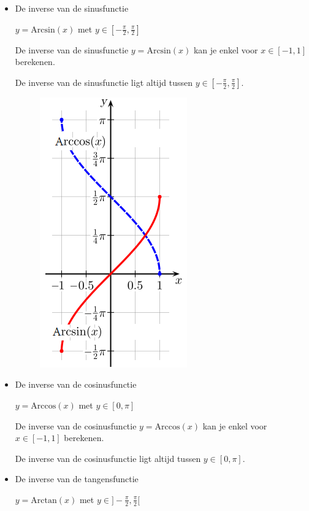\begin{itemize}
\item{De inverse van de sinusfunctie}

\noindent $y=\textrm{Arcsin}(x)$ met ${\displaystyle y\in[-\frac{\pi}{2},\frac{\pi}{2}]}$

De inverse van de sinusfunctie $y=\textrm{Arcsin}(x)$ kan je enkel
voor ${\displaystyle x\in[-1,1]}$ berekenen.

De inverse van de sinusfunctie ligt altijd tussen ${\displaystyle y\in[-\frac{\pi}{2},\frac{\pi}{2}]}$.

\begin{figure}
	\includegraphics{2_elem_rekenvaardigheden_B/inputs/Arcsine_Arccosine_svg}
\end{figure}



\item{De inverse van de cosinusfunctie}

\noindent $y=\textrm{Arccos}(x)$ met ${\displaystyle y\in[0,\pi]}$

De inverse van de cosinusfunctie $y=\textrm{Arccos}(x)$ kan je enkel
voor ${\displaystyle x\in[-1,1]}$ berekenen.

De inverse van de cosinusfunctie ligt altijd tussen ${\displaystyle y\in[0,\pi]}$.


\item{De inverse van de tangensfunctie}

\noindent $y=\textrm{Arctan}(x)$ met ${\displaystyle y\in]-\frac{\pi}{2},\frac{\pi}{2}[}$


\end{itemize}
